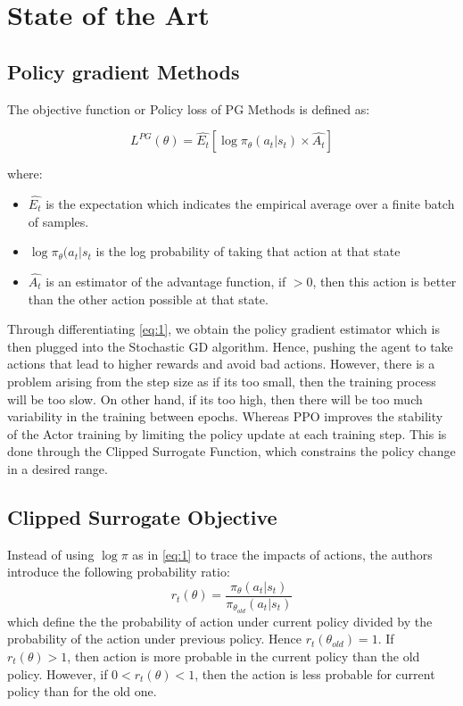\documentclass[12pt,a4paper]{article}
\begin{document}
\section{State of the Art}

\subsection{Policy gradient Methods}
The objective function or Policy loss of PG Methods is defined as: 


\begin{equation}
L^{PG}(\theta) =\hat{E_{t}} [\log \pi_{\theta} (a_t|s_t) \times \hat{{A_t}}  ] 
\end{equation}\label{eq:1}


where:
\begin{itemize}
\item  $\hat{{E_t}}$ is the expectation which indicates the empirical average over a finite batch of samples.
\item $\log \pi_{\theta} (a_t|s_t$ is the log probability of taking that action at that state 
\item $\hat{{A_t}}$ is an estimator of the advantage function, if $>0$, then this action is better than the other action possible at that state.
\end{itemize}
Through differentiating \ref{eq:1}, we obtain the policy gradient estimator which is then plugged into the Stochastic GD algorithm. Hence, pushing the agent to take actions that lead to higher rewards and avoid bad actions. However, there is a problem arising from the step size as if its too small, then the training process will be too slow. On other hand, if its too high, then there will be too much variability in the training between epochs.
Whereas PPO improves the stability of the Actor training by limiting the policy update at each training step. This is done through the Clipped Surrogate Function, which constrains the policy change in a desired range.

\subsection{Clipped Surrogate Objective}
Instead of using $\log \pi$ as in \ref{eq:1} to trace the impacts of actions, the authors introduce the following probability ratio:
\begin{equation}
r_t (\theta) =\frac{\pi_{\theta}(a_t|s_t)}{ \pi_{\theta_{old}} (a_t|s_t) }
\end{equation}
which define the the probability of action under current policy divided by the probability of the action under previous policy. Hence $r_t(\theta_{old}) = 1$.\newline
If $r_t(\theta) > 1$, then action is more probable in the current policy than the old policy. However, if $0 < r_t(\theta) < 1$, then the action is less probable for current policy than for the old one.
\end{document}
